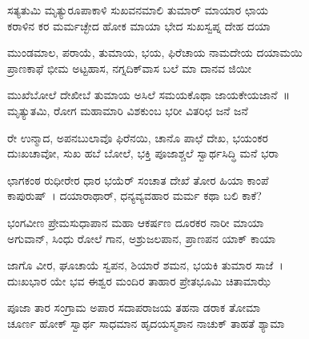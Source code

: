 
\begin{myquote}
ಸತ್ಯತುಮಿ ಮೃತ್ಯುರೂಪಾಕಾಳಿ ಸುಖವನಮಾಲಿ ತುಮಾರ್‌ ಮಾಯಾರ ಛಾಯ\\ಕರಾಳಿನ ಕರ ಮರ್ಮಚ್ಛೇದ ಹೋಕ ಮಾಯಾ ಭೇದ ಸುಖಸ್ವಪ್ನ ದೇಹ ದಯಾ
\end{myquote}


\begin{myquote}
ಮುಂಡಮಾಲ, ಪರಾಯೆ, ತುಮಾಯ, ಭಯ, ಫಿರೆಚಾಯ ನಾಮದೇಯ ದಯಾಮಯಿ\\ಪ್ರಾಣಕಾಫೆ ಭೀಮ ಅಟ್ಟಹಾಸ, ನಗ್ನದಿಕ್‌ವಾಸ ಬಲೆ ಮಾ ದಾನವ ಜಿಯೀ
\end{myquote}


\begin{myquote}
ಮುಖೆಬೋಲೆ ದೇಖೀಬೆ ತುಮಾಯ ಅಸಿಲೆ ಸಮಯಕೊಥಾ ಜಾಯಕೇಯಜಾನೆ~॥\\ಮೃತ್ಯುತಮಿ, ರೋಗ ಮಹಾಮಾರಿ ವಿಶಕುಂಬ ಭರೀ ವಿತರಿಛ ಜನೆ ಜನೆ
\end{myquote}


\begin{myquote}
ರೇ ಉನ್ಮಾದ, ಅಪನಬುಲಾವೊ ಫಿರೆನಯಿ, ಚಾನೊ ಪಾಛೆ ದೇಖ, ಭಯಂಕರ\\ದುಃಖಚಾವೋ, ಸುಖ ಹಬೆ ಬೋಲೆ, ಭಕ್ತಿ ಪೂಜಾಶ್ಚಲೆ ಸ್ವಾರ್ಥಸಿದ್ಧಿ ಮನೆ ಭರಾ
\end{myquote}


\begin{myquote}
ಛಾಗಕಂಠ ರುಧೀರೇರ ಧಾರ ಭಯೆರ್ ಸಂಚಾತ ದೇಖೆ ತೋರ ಹಿಯಾ ಕಾಂಪೆ\\ಕಾಪುರುಷ್~। ದಯಾರಾಥಾರ್, ಧನ್ಯವ್ಯವಹಾರ ಮರ್ಮ ಕಥಾ ಬಲಿ ಕಾಕೆ?
\end{myquote}


\begin{myquote}
ಭಂಗವೀಣ ಪ್ರೇಮಸುಧಾಪಾನ ಮಹಾ ಆಕರ್ಷಣ ದೂರಕರ ನಾರೀ ಮಾಯಾ\\ಅಗುವಾನ್, ಸಿಂಧು ರೋಲೆ ಗಾನ, ಅಶ್ರುಜಲಪಾನ, ಪ್ರಾಣಪನ ಯಾಕ್ ಕಾಯಾ
\end{myquote}


\begin{myquote}
ಜಾಗೊ ವೀರ, ಘೂಚಾಯೆ ಸ್ವಪನ, ಶಿಯಾರೆ ಶಮನ, ಭಯಕಿ ತುಮಾರ ಸಾಜೆ~।\\ದುಃಖಭಾರ ಯೇ ಭವ ಈಶ್ವರ ಮಂದಿರ ತಾಹಾರ ಪ್ರೇತಭೂಮಿ ಚಿತಾಮಾಝೆ
\end{myquote}


\begin{myquote}
ಪೂಜಾ ತಾರ ಸಂಗ್ರಾಮ ಅಪಾರ ಸದಾಪರಾಜಯ ತಹನಾ ಡರಾಕ ತೋಮಾ\\ಚೂರ್ಣ ಹೋಕ್ ಸ್ವಾರ್ಥ ಸಾಧಮಾನ ಹೃದಯಸ್ಮಶಾನ ನಾಚುಕ್ ತಾಹತೆ ಶ್ಯಾಮಾ
\end{myquote}

